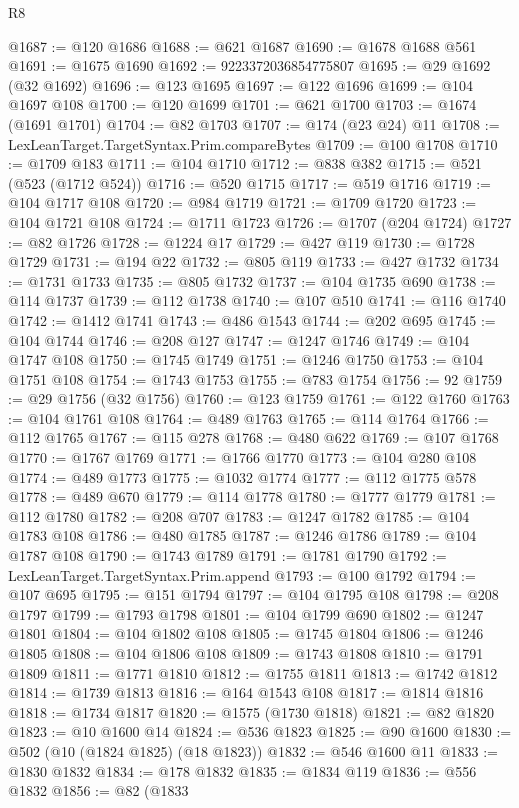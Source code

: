 \begin{lexlean}{R8}
\begin{coremodule}
@1687 := @120 @1686
@1688 := @621 @1687
@1690 := @1678 @1688 @561
@1691 := @1675 @1690
@1692 := 9223372036854775807
@1695 := @29 @1692 (@32 @1692)
@1696 := @123 @1695
@1697 := @122 @1696
@1699 := @104 @1697 @108
@1700 := @120 @1699
@1701 := @621 @1700
@1703 := @1674 (@1691 @1701)
@1704 := @82 @1703
@1707 := @174 (@23 @24) @11
@1708 := LexLeanTarget.TargetSyntax.Prim.compareBytes
@1709 := @100 @1708
@1710 := @1709 @183
@1711 := @104 @1710
@1712 := @838 @382
@1715 := @521 (@523 (@1712 @524))
@1716 := @520 @1715
@1717 := @519 @1716
@1719 := @104 @1717 @108
@1720 := @984 @1719
@1721 := @1709 @1720
@1723 := @104 @1721 @108
@1724 := @1711 @1723
@1726 := @1707 (@204 @1724)
@1727 := @82 @1726
@1728 := @1224 @17
@1729 := @427 @119
@1730 := @1728 @1729
@1731 := @194 @22
@1732 := @805 @119
@1733 := @427 @1732
@1734 := @1731 @1733
@1735 := @805 @1732
@1737 := @104 @1735 @690
@1738 := @114 @1737
@1739 := @112 @1738
@1740 := @107 @510
@1741 := @116 @1740
@1742 := @1412 @1741
@1743 := @486 @1543
@1744 := @202 @695
@1745 := @104 @1744
@1746 := @208 @127
@1747 := @1247 @1746
@1749 := @104 @1747 @108
@1750 := @1745 @1749
@1751 := @1246 @1750
@1753 := @104 @1751 @108
@1754 := @1743 @1753
@1755 := @783 @1754
@1756 := 92
@1759 := @29 @1756 (@32 @1756)
@1760 := @123 @1759
@1761 := @122 @1760
@1763 := @104 @1761 @108
@1764 := @489 @1763
@1765 := @114 @1764
@1766 := @112 @1765
@1767 := @115 @278
@1768 := @480 @622
@1769 := @107 @1768
@1770 := @1767 @1769
@1771 := @1766 @1770
@1773 := @104 @280 @108
@1774 := @489 @1773
@1775 := @1032 @1774
@1777 := @112 @1775 @578
@1778 := @489 @670
@1779 := @114 @1778
@1780 := @1777 @1779
@1781 := @112 @1780
@1782 := @208 @707
@1783 := @1247 @1782
@1785 := @104 @1783 @108
@1786 := @480 @1785
@1787 := @1246 @1786
@1789 := @104 @1787 @108
@1790 := @1743 @1789
@1791 := @1781 @1790
@1792 := LexLeanTarget.TargetSyntax.Prim.append
@1793 := @100 @1792
@1794 := @107 @695
@1795 := @151 @1794
@1797 := @104 @1795 @108
@1798 := @208 @1797
@1799 := @1793 @1798
@1801 := @104 @1799 @690
@1802 := @1247 @1801
@1804 := @104 @1802 @108
@1805 := @1745 @1804
@1806 := @1246 @1805
@1808 := @104 @1806 @108
@1809 := @1743 @1808
@1810 := @1791 @1809
@1811 := @1771 @1810
@1812 := @1755 @1811
@1813 := @1742 @1812
@1814 := @1739 @1813
@1816 := @164 @1543 @108
@1817 := @1814 @1816
@1818 := @1734 @1817
@1820 := @1575 (@1730 @1818)
@1821 := @82 @1820
@1823 := @10 @1600 @14
@1824 := @536 @1823
@1825 := @90 @1600
@1830 := @502 (@10 (@1824 @1825) (@18 @1823))
@1832 := @546 @1600 @11
@1833 := @1830 @1832
@1834 := @178 @1832
@1835 := @1834 @119
@1836 := @556 @1832
@1856 := @82
    (@1833

\end{coremodule}
\end{lexlean}
